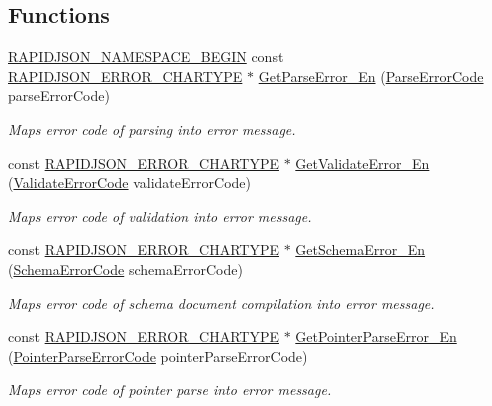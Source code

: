 \subsection*{Functions}
\begin{DoxyCompactItemize}
\item 
\hyperlink{group__RAPIDJSON__CONFIG_gad3806c8251fdc7da9618b7e922674ffc}{R\+A\+P\+I\+D\+J\+S\+O\+N\+\_\+\+N\+A\+M\+E\+S\+P\+A\+C\+E\+\_\+\+B\+E\+G\+IN} const \hyperlink{group__RAPIDJSON__ERRORS_ga7e4636fd48d0148f102b8a13f0539d8c}{R\+A\+P\+I\+D\+J\+S\+O\+N\+\_\+\+E\+R\+R\+O\+R\+\_\+\+C\+H\+A\+R\+T\+Y\+PE} $\ast$ \hyperlink{group__RAPIDJSON__ERRORS_ga755b523205f46c980c80d12e230a3abd}{Get\+Parse\+Error\+\_\+\+En} (\hyperlink{group__RAPIDJSON__ERRORS_ga8d4b32dfc45840bca189ade2bbcb6ba7}{Parse\+Error\+Code} parse\+Error\+Code)
\begin{DoxyCompactList}\small\item\em Maps error code of parsing into error message. \end{DoxyCompactList}\item 
const \hyperlink{group__RAPIDJSON__ERRORS_ga7e4636fd48d0148f102b8a13f0539d8c}{R\+A\+P\+I\+D\+J\+S\+O\+N\+\_\+\+E\+R\+R\+O\+R\+\_\+\+C\+H\+A\+R\+T\+Y\+PE} $\ast$ \hyperlink{group__RAPIDJSON__ERRORS_gade9d7778693290f23a627630c73e6edf}{Get\+Validate\+Error\+\_\+\+En} (\hyperlink{group__RAPIDJSON__ERRORS_ga2e1f88f94a5d9a6817a5de0ed2f0105a}{Validate\+Error\+Code} validate\+Error\+Code)
\begin{DoxyCompactList}\small\item\em Maps error code of validation into error message. \end{DoxyCompactList}\item 
const \hyperlink{group__RAPIDJSON__ERRORS_ga7e4636fd48d0148f102b8a13f0539d8c}{R\+A\+P\+I\+D\+J\+S\+O\+N\+\_\+\+E\+R\+R\+O\+R\+\_\+\+C\+H\+A\+R\+T\+Y\+PE} $\ast$ \hyperlink{group__RAPIDJSON__ERRORS_ga14d079416a08527108f622b197061540}{Get\+Schema\+Error\+\_\+\+En} (\hyperlink{group__RAPIDJSON__ERRORS_ga64f496d2cee8c9673f3105ec6008f290}{Schema\+Error\+Code} schema\+Error\+Code)
\begin{DoxyCompactList}\small\item\em Maps error code of schema document compilation into error message. \end{DoxyCompactList}\item 
const \hyperlink{group__RAPIDJSON__ERRORS_ga7e4636fd48d0148f102b8a13f0539d8c}{R\+A\+P\+I\+D\+J\+S\+O\+N\+\_\+\+E\+R\+R\+O\+R\+\_\+\+C\+H\+A\+R\+T\+Y\+PE} $\ast$ \hyperlink{group__RAPIDJSON__ERRORS_gab0c2320924fc7f2cdca02a4ce104fd8e}{Get\+Pointer\+Parse\+Error\+\_\+\+En} (\hyperlink{group__RAPIDJSON__ERRORS_gacb2e274f33e54d91b96e9883a99a98be}{Pointer\+Parse\+Error\+Code} pointer\+Parse\+Error\+Code)
\begin{DoxyCompactList}\small\item\em Maps error code of pointer parse into error message. \end{DoxyCompactList}\end{DoxyCompactItemize}


